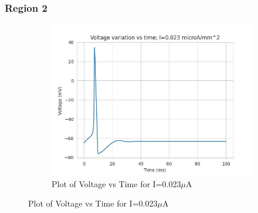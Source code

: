\documentclass{article}
\begin{document}
\subsubsection{Region 2}

\begin{figure}[h]
    \centering
    \begin{subfigure}[h]{0.45\textwidth}
        \includegraphics[width=1.5\textwidth]{4.jpg}
        \caption{Plot of Voltage vs Time for I=0.023$\mu$A}
        \label{fig:IOU1}
    \end{subfigure}
    

\end{figure}
\end{document}
